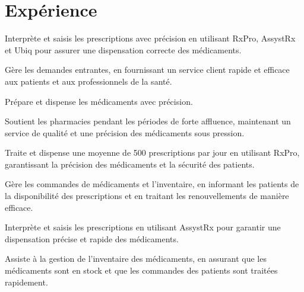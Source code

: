\documentclass[letterpaper,10pt]{article}
\begin{document}
  \section{Expérience}

  \begin{resume_list}
    \item Interprète et saisis les prescriptions avec précision en utilisant RxPro, AssystRx et Ubiq pour assurer une dispensation correcte des médicaments.
    \item Gère les demandes entrantes, en fournissant un service client rapide et efficace aux patients et aux professionnels de la santé.
    \item Prépare et dispense les médicaments avec précision.
    \item Soutient les pharmacies pendant les périodes de forte affluence, maintenant un service de qualité et une précision des médicaments sous pression.
  \end{resume_list}

  \begin{resume_list}
    \item Traite et dispense une moyenne de 500 prescriptions par jour en utilisant RxPro, garantissant la précision des médicaments et la sécurité des patients.
    \item Gère les commandes de médicaments et l'inventaire, en informant les patients de la disponibilité des prescriptions et en traitant les renouvellements de manière efficace.
  \end{resume_list}

  \begin{resume_list}
    \item Interprète et saisis les prescriptions en utilisant AssystRx pour garantir une dispensation précise et rapide des médicaments.
    \item Assiste à la gestion de l'inventaire des médicaments, en assurant que les médicaments sont en stock et que les commandes des patients sont traitées rapidement.
  \end{resume_list}
\end{document}
